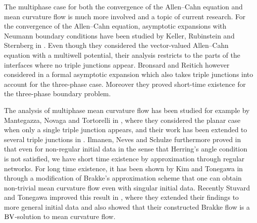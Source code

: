 The multiphase case for both the convergence of the Allen--Cahn equation and 
mean 
curvature flow is much more involved and a topic of current research. For the 
convergence of the Allen--Cahn equation, asymptotic expansions  with Neumann 
boundary conditions 
have been studied by Keller, Rubinstein and Sternberg in 
\cite{keller_rubinstein_sternberg_fast_reaction_slow_diffusion}. Even though 
they considered the vector-valued Allen--Cahn equation with a multiwell 
potential, their analysis restricts to the parts of the interfaces where no 
triple junctions appear. Bronsard and 
Reitich however considered in 
\cite{bronsard_reitich_on_three_phase_boundary_motion_and_singular_limit} a 
formal asymptotic expansion which also takes triple junctions into account
for the three-phase case. Moreover they proved short-time existence for the 
three-phase boundary problem.

The analysis of multiphase mean curvature flow has been studied for example by 
Mantegazza, Novaga and Tortorelli in 
\cite{mantegazza_novaga_tortorelli_motion_by_curvature_of_planar_networks}, 
where they considered the planar case when only a single triple junction 
appears, and their work has been extended to several triple junctions in 
\cite{mantegazza_novaga_pluda_schule_evolution_of_networks_with_multiple_junctions}.
Ilmanen, Neves and Schulze furthermore proved in 
\cite{ilmanen_neves_schulze_on_short_time_existence_for_the_planar_network_flow}
that even for non-regular initial data in the sense that Herring's angle 
condition is not satisfied, we have short time existence by approximation 
through regular networks. For long time existence, it has been shown by Kim and 
Tonegawa in \cite{kim_tonegawa_on_the_mean_curvature_flow_of_grain_boundaries} 
through a modification of Brakke's approximation scheme that one can obtain 
non-trivial mean curvature flow even with singular initial data. Recently 
Stuvard and Tonegawa improved this result in 
\cite{stuvard_tonegawa_on_the_existence_of_canonical_multi_phase_brakke_flow},
where they extended their findings to more general initial data and also showed 
that their constructed Brakke flow is a $ \operatorname{BV} $-solution to mean curvature flow.


